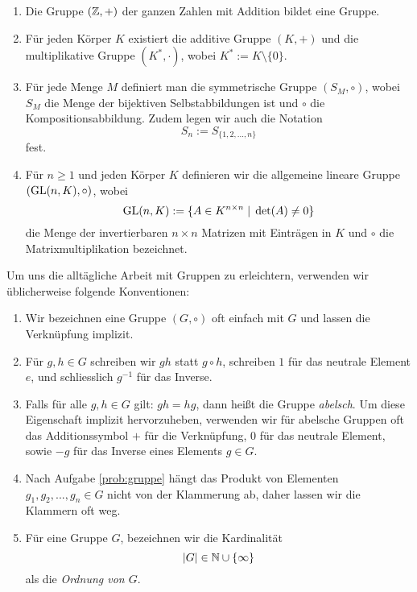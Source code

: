 \documentclass{book}
\begin{document}
\begin{exas} 
    \begin{enumerate}
        \item Die Gruppe $(\mathbb{Z},+)$ der ganzen Zahlen mit Addition bildet eine Gruppe.
        \item Für jeden Körper $K$ existiert die additive Gruppe $(K,+)$ und die multiplikative Gruppe $(K^*, \cdot)$, wobei $K^* := K \setminus \{0\}$. 
        \item Für jede Menge $M$ definiert man die symmetrische Gruppe $(S_M, \circ)$, wobei $S_M$ die
            Menge der bijektiven Selbstabbildungen ist und $\circ$ die
            Kompositionsabbildung. Zudem legen wir auch die Notation
            \[
                S_n := S_{\{1,2,...,n\}}
            \]
            fest. 
        \item Für $n \ge 1$ und jeden Körper $K$ definieren wir die allgemeine lineare Gruppe $(\operatorname{GL}(n,K), \circ)$, wobei
            \[
                \operatorname{GL}(n,K) := \{ A \in K^{n \times n} \; | \; \det(A) \neq 0 \}
            \]
            die Menge der invertierbaren $n \times n$ Matrizen mit Einträgen in
            $K$ und $\circ$ die Matrixmultiplikation bezeichnet. 
    \end{enumerate}
\end{exas}

Um uns die alltägliche Arbeit mit Gruppen zu erleichtern, verwenden wir üblicherweise folgende Konventionen:
\begin{enumerate}
    \item Wir bezeichnen eine Gruppe $(G, \circ)$ oft einfach mit $G$ und lassen die Verknüpfung implizit. 
    \item Für $g,h \in G$ schreiben wir $gh$ statt $g \circ h$, schreiben $1$
        für das neutrale Element $e$, und schliesslich $g^{-1}$ für das
        Inverse. 
    \item Falls für alle $g,h \in G$ gilt: $gh = hg$, dann heißt die Gruppe
        {\em abelsch}. Um diese Eigenschaft implizit hervorzuheben, verwenden
        wir für abelsche Gruppen oft das Additionssymbol $+$ für die
        Verknüpfung, $0$ für das neutrale Element, sowie $-g$ für das Inverse
        eines Elements $g \in G$. 
    \item Nach Aufgabe \ref{prob:gruppe} hängt das Produkt von Elementen $g_1,
        g_2, ..., g_n \in G$ nicht von der Klammerung ab, daher lassen wir die
        Klammern oft weg.
    \item Für eine Gruppe $G$, bezeichnen wir die Kardinalität 
        \[
            |G| \in \mathbb{N} \cup \{\infty\}
        \]
        als die {\em Ordnung von $G$}.
\end{enumerate}
\end{document}
